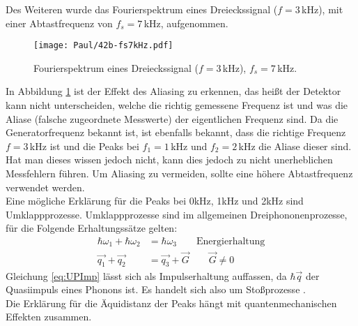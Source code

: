\newpage
Des Weiteren wurde das Fourierspektrum eines Dreieckssignal ($f = 3$\,kHz), mit einer Abtastfrequenz von $f_s = 7$\,kHz, aufgenommen.
\begin{figure}[h]
    \centering
    \texttt{[image: Paul/42b-fs7kHz.pdf]}
    \caption{Fourierspektrum eines Dreieckssignal ($f = 3$\,kHz), $f_s = 7$\,kHz.}
    \label{fig:42a3}
\end{figure}

In Abbildung \ref{fig:42a3} ist der Effekt des Aliasing zu erkennen, das heißt der Detektor kann nicht unterscheiden, welche die richtig gemessene Frequenz ist und was die Aliase (falsche zugeordnete Messwerte) der eigentlichen Frequenz sind. Da die Generatorfrequenz bekannt ist, ist ebenfalls bekannt, dass die richtige Frequenz $f=3$\,kHz ist und die Peaks bei $f_1=1$\,kHz und $f_2=2$\,kHz die Aliase dieser sind. Hat man dieses wissen jedoch nicht, kann dies jedoch zu nicht unerheblichen Messfehlern führen. Um Aliasing zu vermeiden, sollte eine höhere Abtastfrequenz verwendet werden.\\

Eine mögliche Erklärung für die Peaks bei 0kHz, 1kHz und 2kHz sind Umklappprozesse.
Umklappprozesse sind im allgemeinen Dreiphononenprozesse, für die Folgende Erhaltungssätze gelten:
\begin{align}
    \hbar \omega_1 +\hbar \omega_2 &= \hbar \omega_3  \qquad \text{Energierhaltung}\\
    \vec{q_1} + \vec{q_2} &= \vec{q_3} + \vec{G} \qquad \vec{G} \neq 0 \label{eq:UPImp}
\end{align}
Gleichung \ref{eq:UPImp} lässt sich als Impulserhaltung auffassen, da \( \hbar \vec{q}\) der Quasiimpuls eines Phonons ist. Es handelt sich also um Stoßprozesse \citep{EFP}.\\
Die Erklärung für die Äquidistanz der Peaks hängt mit quantenmechanischen Effekten zusammen.